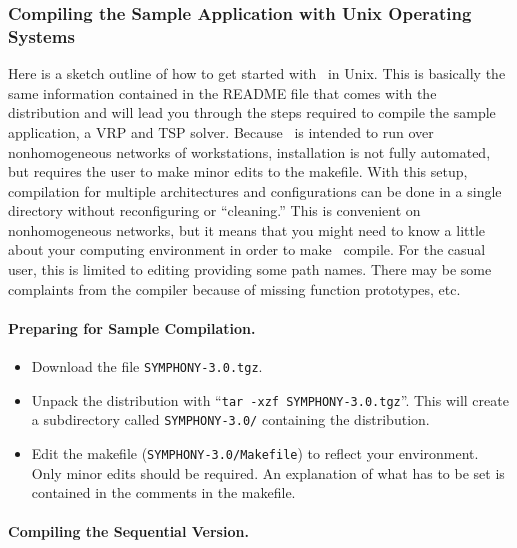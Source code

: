 \subsubsection{Compiling the Sample Application with Unix Operating Systems}

Here is a sketch outline of how to get started with \BB\ in Unix. This is
basically the same information contained in the README file that comes with
the distribution and will lead you through the steps required to compile the
sample application, a VRP and TSP solver. Because \BB\ is intended to run over
nonhomogeneous networks of workstations, installation is not fully automated,
but requires the user to make minor edits to the makefile.  With this setup,
compilation for multiple architectures and configurations can be done in a
single directory without reconfiguring or ``cleaning.'' This is convenient on
nonhomogeneous networks, but it means that you might need to know a little
about your computing environment in order to make \BB\ compile. For the casual
user, this is limited to editing providing some path names. There may be some
complaints from the compiler because of missing function prototypes, etc.

\paragraph{Preparing for Sample Compilation.}

\begin{itemize}

        \item Download the file {\tt SYMPHONY-3.0.tgz}.

        \item Unpack the distribution with ``{\tt tar -xzf
        SYMPHONY-3.0.tgz}''. This will create a subdirectory called
        {\tt SYMPHONY-3.0/} containing the distribution.
        
        \item Edit the makefile ({\tt SYMPHONY-3.0/Makefile}) to reflect your
	environment. Only minor edits should be required. An explanation of
	what has to be set is contained in the comments in the makefile.

\end{itemize}
        
\paragraph{Compiling the Sequential Version.}

